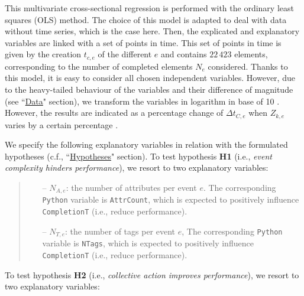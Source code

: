 \documentclass[unnumsec,webpdf,contemporary,large]{oup-authoring-template}%
\theoremstyle{thmstyleone}%
\theoremstyle{thmstyletwo}%
\theoremstyle{thmstylethree}%
\begin{document}
This multivariate cross-sectional regression is performed with the ordinary least squares (OLS) method. The choice of this model is  adapted to deal with data without time series, which is the case here. Then, the explicated and explanatory variables are linked with a set of points in time. This set of points in time is given by the creation $t_{c,e}$ of the different $e$ and contains $22\,423$ elements, corresponding to the number of completed elements $N_e$ considered.  
Thanks to this model, it is easy to consider all chosen independent variables. However, due to the heavy-tailed behaviour of the variables and their difference of magnitude (see ``\hyperref[sec:data]{Data}" section), we transform the variables in logarithm in base of 10 \cite{benoit_linear_2011}. However, the results are indicated as a percentage change of $\Delta t_{C,e}$ when $Z_{k,e}$ varies by a certain percentage \cite{benoit_linear_2011}.

We specify the following explanatory variables in relation with the formulated hypotheses (c.f., ``\hyperref[sec:hypotheses]{Hypotheses}" section). To test hypothesis {\bf H1} (i.e., {\it event complexity hinders performance}), we resort to two explanatory variables:
\begin{quote}
\begin{itemize}
    \item[--] $N_{A,e}$: the number of attributes per event $e$. The corresponding \texttt{Python} variable is \texttt{AttrCount}, which is expected to positively influence \texttt{CompletionT} (i.e., reduce performance).
    \item[--] $N_{T,e}$: the number of tags per event $e$, The corresponding \texttt{Python} variable is \texttt{NTags}, which is expected to positively influence \texttt{CompletionT} (i.e., reduce performance). 
\end{itemize}
\end{quote}

To test hypothesis {\bf H2} (i.e., {\it collective action improves performance}), we resort to two explanatory variables:
\end{document}
